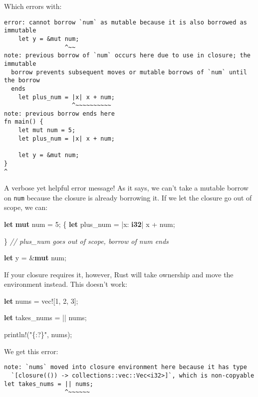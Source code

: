 \documentclass[a4paper,]{book}
\newenvironment{Shaded}{\begin{snugshade}}{\end{snugshade}}
\newcommand{\KeywordTok}[1]{\textcolor[rgb]{0.13,0.29,0.53}{\textbf{{#1}}}}
\newcommand{\DecValTok}[1]{\textcolor[rgb]{0.00,0.00,0.81}{{#1}}}
\newcommand{\StringTok}[1]{\textcolor[rgb]{0.31,0.60,0.02}{{#1}}}
\newcommand{\CommentTok}[1]{\textcolor[rgb]{0.56,0.35,0.01}{\textit{{#1}}}}
\newcommand{\OtherTok}[1]{\textcolor[rgb]{0.56,0.35,0.01}{{#1}}}
\newcommand{\NormalTok}[1]{{#1}}
\begin{document}
Which errors with:

\begin{verbatim}
error: cannot borrow `num` as mutable because it is also borrowed as immutable
    let y = &mut num;
                 ^~~
note: previous borrow of `num` occurs here due to use in closure; the immutable
  borrow prevents subsequent moves or mutable borrows of `num` until the borrow
  ends
    let plus_num = |x| x + num;
                   ^~~~~~~~~~~
note: previous borrow ends here
fn main() {
    let mut num = 5;
    let plus_num = |x| x + num;

    let y = &mut num;
}
^
\end{verbatim}

A verbose yet helpful error message! As it says, we can't take a mutable
borrow on \texttt{num} because the closure is already borrowing it. If
we let the closure go out of scope, we can:

\begin{Shaded}
\begin{Highlighting}[]
\KeywordTok{let} \KeywordTok{mut} \NormalTok{num = }\DecValTok{5}\NormalTok{;}
\NormalTok{\{}
    \KeywordTok{let} \NormalTok{plus_num = |x: }\KeywordTok{i32}\NormalTok{| x + num;}

\NormalTok{\} }\CommentTok{// plus_num goes out of scope, borrow of num ends}

\KeywordTok{let} \NormalTok{y = &}\KeywordTok{mut} \NormalTok{num;}
\end{Highlighting}
\end{Shaded}

If your closure requires it, however, Rust will take ownership and move
the environment instead. This doesn't work:

\begin{Shaded}
\begin{Highlighting}[]
\KeywordTok{let} \NormalTok{nums = }\OtherTok{vec!}\NormalTok{[}\DecValTok{1}\NormalTok{, }\DecValTok{2}\NormalTok{, }\DecValTok{3}\NormalTok{];}

\KeywordTok{let} \NormalTok{takes_nums = || nums;}

\OtherTok{println!}\NormalTok{(}\StringTok{"\{:?\}"}\NormalTok{, nums);}
\end{Highlighting}
\end{Shaded}

We get this error:

\begin{verbatim}
note: `nums` moved into closure environment here because it has type
  `[closure(()) -> collections::vec::Vec<i32>]`, which is non-copyable
let takes_nums = || nums;
                 ^~~~~~~
\end{verbatim}
\end{document}
